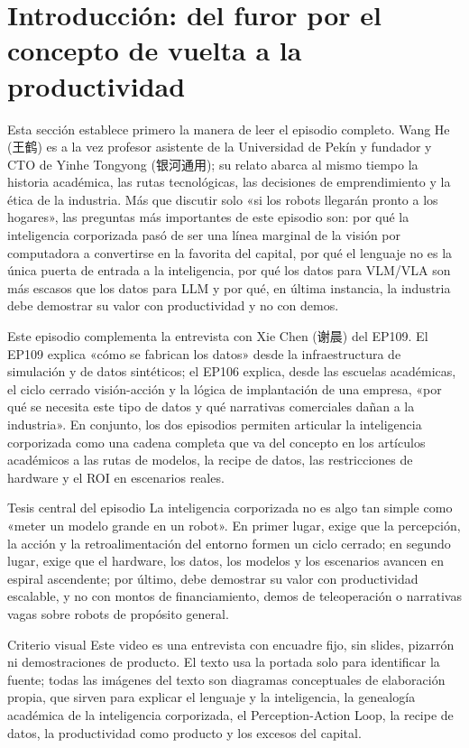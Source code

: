 \section{Introducción: del furor por el concepto de vuelta a la productividad}

Esta sección establece primero la manera de leer el episodio completo. Wang He (王鹤) es a la vez profesor asistente de la Universidad de Pekín y fundador y CTO de Yinhe Tongyong (银河通用); su relato abarca al mismo tiempo la historia académica, las rutas tecnológicas, las decisiones de emprendimiento y la ética de la industria. Más que discutir solo «si los robots llegarán pronto a los hogares», las preguntas más importantes de este episodio son: por qué la inteligencia corporizada pasó de ser una línea marginal de la visión por computadora a convertirse en la favorita del capital, por qué el lenguaje no es la única puerta de entrada a la inteligencia, por qué los datos para VLM/VLA son más escasos que los datos para LLM y por qué, en última instancia, la industria debe demostrar su valor con productividad y no con demos.

Este episodio complementa la entrevista con Xie Chen (谢晨) del EP109. El EP109 explica «cómo se fabrican los datos» desde la infraestructura de simulación y de datos sintéticos; el EP106 explica, desde las escuelas académicas, el ciclo cerrado visión-acción y la lógica de implantación de una empresa, «por qué se necesita este tipo de datos y qué narrativas comerciales dañan a la industria». En conjunto, los dos episodios permiten articular la inteligencia corporizada como una cadena completa que va del concepto en los artículos académicos a las rutas de modelos, la recipe de datos, las restricciones de hardware y el ROI en escenarios reales.

\begin{importantbox}{Tesis central del episodio}
La inteligencia corporizada no es algo tan simple como «meter un modelo grande en un robot». En primer lugar, exige que la percepción, la acción y la retroalimentación del entorno formen un ciclo cerrado; en segundo lugar, exige que el hardware, los datos, los modelos y los escenarios avancen en espiral ascendente; por último, debe demostrar su valor con productividad escalable, y no con montos de financiamiento, demos de teleoperación o narrativas vagas sobre robots de propósito general.
\end{importantbox}

\begin{knowledgebox}{Criterio visual}
Este video es una entrevista con encuadre fijo, sin slides, pizarrón ni demostraciones de producto. El texto usa la portada solo para identificar la fuente; todas las imágenes del texto son diagramas conceptuales de elaboración propia, que sirven para explicar el lenguaje y la inteligencia, la genealogía académica de la inteligencia corporizada, el Perception-Action Loop, la recipe de datos, la productividad como producto y los excesos del capital.
\end{knowledgebox}

